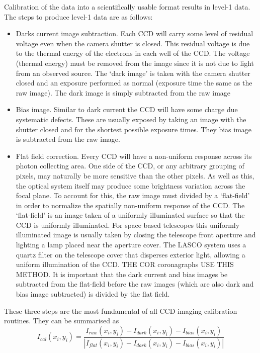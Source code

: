 Calibration of the data into a scientifically usable format results in level-1 data. The steps to produce level-1 data are as follows:
\begin{itemize}
\item Darks current image subtraction. Each CCD will carry some level of residual voltage even when the camera shutter is closed. This residual voltage is due to the thermal energy of the electrons in each well of the CCD. The voltage (thermal energy) must be removed from the image since it is not due to light from an observed source. The `dark image' is taken with the camera shutter closed and an exposure performed as normal (exposure time the same as the raw image). The dark image is simply subtracted from the raw image
\item Bias image. Similar to dark current the CCD will have some charge due systematic defects. These are usually exposed by taking an image with the shutter closed and for the shortest possible exposure times. They bias image is subtracted from the raw image.
\item Flat field correction. Every CCD will have a non-uniform response across its photon collecting area. One side of the CCD, or any arbitrary grouping of pixels, may naturally be more sensitive than the other pixels. As well as this, the optical system itself may produce some brightness variation across the focal plane. To account for this, the raw image must divided by a `flat-field' in order to normalize the spatially non-uniform response of the CCD. The `flat-field' is an image taken of a uniformly illuminated surface so that the CCD is uniformly illuminated. For space based telescopes this uniformly illuminated image is usually taken by closing the telescope front aperture and lighting a lamp placed near the aperture cover. The LASCO system uses a quartz filter on the telescope cover that disperses exterior light, allowing a uniform illumination of the CCD. THE COR coronagraphs USE THIS METHOD. It is important that the dark current and bias images be subtracted from the flat-field before the raw images (which are also dark and bias image subtracted) is divided by the flat field.
\end{itemize}
These three steps are the most fundamental of all CCD imaging calibration routines. They can be summarised as
\begin{equation}
I_{cal}(x_i, y_i) = \frac{ I_{raw}(x_i, y_i)  - I_{dark}(x_i, y_i) - I_{bias}(x_i, y_i)  }{ | I_{flat}(x_i, y_i) - I_{dark}(x_i, y_i) - I_{bias}(x_i, y_i)| }
\end{equation}
